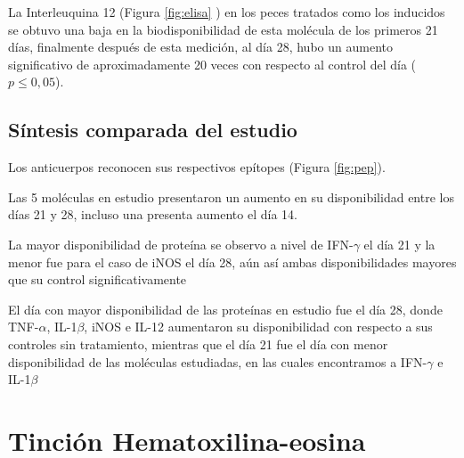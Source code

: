 \documentclass[12pt,letterpaper,oneside]{scrbook}
\begin{document}
La Interleuquina 12 (Figura \ref{fig:elisa} ) en
los peces tratados como los inducidos se obtuvo una baja en la
biodisponibilidad de esta molécula de los primeros 21 días, finalmente
después de esta medición, al día 28, hubo un aumento significativo de
aproximadamente 20 veces con respecto al control del día
(\(p \leq 0,05\)).

\subsection{Síntesis comparada del estudio}

Los anticuerpos reconocen sus respectivos epítopes (Figura
\ref{fig:pep}).

Las 5 moléculas en estudio presentaron un aumento en su disponibilidad
entre los días 21 y 28, incluso una presenta aumento el día 14.

La mayor disponibilidad de proteína se observo a nivel de IFN-\(\gamma\)
el día 21 y la menor fue para el caso de iNOS el día 28, aún así ambas
disponibilidades mayores que su control significativamente

El día con mayor disponibilidad de las proteínas en estudio fue el día
28, donde TNF-\(\alpha\), IL-1\(\beta\), iNOS e IL-12 aumentaron su
disponibilidad con respecto a sus controles sin tratamiento, mientras
que el día 21 fue el día con menor disponibilidad de las moléculas
estudiadas, en las cuales encontramos a IFN-\(\gamma\) e IL-1\(\beta\)

\clearpage

\section{Tinción Hematoxilina-eosina}
\end{document}
